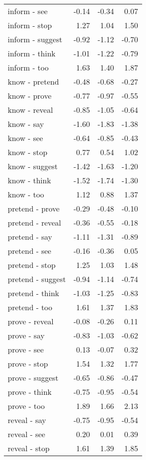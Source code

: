 \begin{longtable}{lrrr}
  inform - see & -0.14 & -0.34 & 0.07 \\ 
  inform - stop & 1.27 & 1.04 & 1.50 \\ 
  inform - suggest & -0.92 & -1.12 & -0.70 \\ 
  inform - think & -1.01 & -1.22 & -0.79 \\ 
  inform - too & 1.63 & 1.40 & 1.87 \\ 
  know - pretend & -0.48 & -0.68 & -0.27 \\ 
  know - prove & -0.77 & -0.97 & -0.55 \\ 
  know - reveal & -0.85 & -1.05 & -0.64 \\ 
  know - say & -1.60 & -1.83 & -1.38 \\ 
  know - see & -0.64 & -0.85 & -0.43 \\ 
  know - stop & 0.77 & 0.54 & 1.02 \\ 
  know - suggest & -1.42 & -1.63 & -1.20 \\ 
  know - think & -1.52 & -1.74 & -1.30 \\ 
  know - too & 1.12 & 0.88 & 1.37 \\ 
  pretend - prove & -0.29 & -0.48 & -0.10 \\ 
  pretend - reveal & -0.36 & -0.55 & -0.18 \\ 
  pretend - say & -1.11 & -1.31 & -0.89 \\ 
  pretend - see & -0.16 & -0.36 & 0.05 \\ 
  pretend - stop & 1.25 & 1.03 & 1.48 \\ 
  pretend - suggest & -0.94 & -1.14 & -0.74 \\ 
  pretend - think & -1.03 & -1.25 & -0.83 \\ 
  pretend - too & 1.61 & 1.37 & 1.83 \\ 
  prove - reveal & -0.08 & -0.26 & 0.11 \\ 
  prove - say & -0.83 & -1.03 & -0.62 \\ 
  prove - see & 0.13 & -0.07 & 0.32 \\ 
  prove - stop & 1.54 & 1.32 & 1.77 \\ 
  prove - suggest & -0.65 & -0.86 & -0.47 \\ 
  prove - think & -0.75 & -0.95 & -0.54 \\ 
  prove - too & 1.89 & 1.66 & 2.13 \\ 
  reveal - say & -0.75 & -0.95 & -0.54 \\ 
  reveal - see & 0.20 & 0.01 & 0.39 \\ 
  reveal - stop & 1.61 & 1.39 & 1.85 \\ 

\end{longtable}
